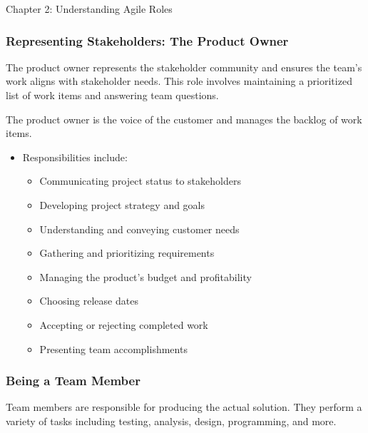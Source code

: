 \begin{notes}{Chapter 2: Understanding Agile Roles}
    \subsubsection*{Representing Stakeholders: The Product Owner}
    
    The product owner represents the stakeholder community and ensures the team's work aligns with stakeholder needs. This role involves maintaining a prioritized list of work items and answering team questions.
    
    \begin{highlight}
    
        The product owner is the voice of the customer and manages the backlog of work items.
        
        \begin{itemize}
            \item Responsibilities include:
            \begin{itemize}
                \item Communicating project status to stakeholders
                \item Developing project strategy and goals
                \item Understanding and conveying customer needs
                \item Gathering and prioritizing requirements
                \item Managing the product's budget and profitability
                \item Choosing release dates
                \item Accepting or rejecting completed work
                \item Presenting team accomplishments
            \end{itemize}
        \end{itemize}
    
    \end{highlight}
    
    \subsubsection*{Being a Team Member}
    
    Team members are responsible for producing the actual solution. They perform a variety of tasks including testing, analysis, design, programming, and more.
    
    \begin{highlight}
    

\end{highlight}
\end{notes}
